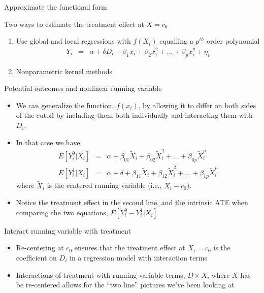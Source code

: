 \documentclass{beamer}
\begin{document}
\begin{frame}{Approximate the functional form}

Two ways to estimate the treatment effect at $X=c_0$

\bigskip

		\begin{enumerate}
		\item Use global and local regressions with $f(X_i)$ equalling a $p^{th}$ order polynomial 
		\begin{eqnarray*}
		Y_i&=&\alpha +\delta{D_i}  +  \beta_1x_i + \beta_2x_i^2 + \dots + \beta_px_i^p + \eta_i
		\end{eqnarray*}
		\item Nonparametric kernel methods
		\end{enumerate}
\end{frame}

\begin{frame}{Potential outcomes and nonlinear running variable}
	
	\begin{itemize}
	\item We can generalize the function, $f(x_i)$, by allowing it to differ on both sides of the cutoff by including them both individually and interacting them with $D_i$.  
	\item In that case we have:
		\begin{eqnarray*}
		E[Y_i^0 | X_i] &=& \alpha + \beta_{01}\tilde{X}_i + \beta_{02}\tilde{X}_i^2 + \dots + \beta_{0p}\tilde{X}_i^p \\
		E[Y_i^1 | X_i] &=& \alpha + \delta + \beta_{11}\tilde{X}_i + \beta_{12}\tilde{X}_i^2 + \dots + \beta_{1p}\tilde{X}_i^p
		\end{eqnarray*}where $\tilde{X}_i$ is the centered running variable (i.e., $X_i - c_0$). 
	\item Notice the treatment effect in the second line, and the intrinsic ATE when comparing the two equations, $E[Y_i^0 - Y_i^1 | X_i]$	
	\end{itemize}
\end{frame}


\begin{frame}{Interact running variable with treatment}

\begin{itemize}
		\item Re-centering at $c_0$ ensures that the treatment effect at $X_i=c_0$ is the coefficient on $D_i$ in a regression model with interaction terms
		\item Interactions of treatment with running variable terms, $D \times X$, where $X$ has be re-centered allows for the ``two line'' pictures we've been looking at
\end{itemize}

\end{frame}
\end{document}
